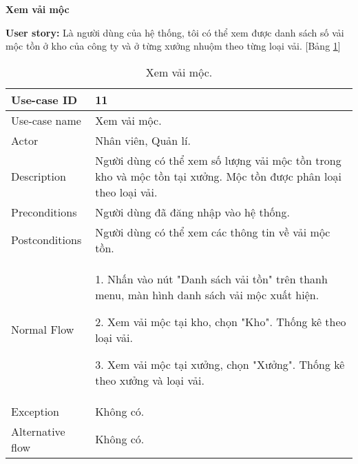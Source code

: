 \textbf{Xem vải mộc}\par
\textbf{User story:} Là người dùng của hệ thống, tôi có thể xem được danh sách số vải mộc tồn ở kho của công ty và ở từng xưởng nhuộm theo từng loại vải. [Bảng \ref{bang8}]
\begin{table}[H]
    \centering
    \begin{tabular}{|m{3cm}|m{10cm}|}
    \hline 
        Use-case ID & 11\\ \hline
        Use-case name & Xem vải mộc.\\ \hline
        Actor & Nhân viên, Quản lí.\\ \hline
        Description & Người dùng có thể xem số lượng vải mộc tồn trong kho và mộc tồn tại xưởng. Mộc tồn được phân loại theo loại vải.\\ \hline
        Preconditions & Người dùng đã đăng nhập vào hệ thống.\\ \hline
        Postconditions & Người dùng có thể xem các thông tin về vải mộc tồn.\\ \hline
        Normal Flow & 
        1. Nhấn vào nút "Danh sách vải tồn" trên thanh menu, màn hình danh sách vải mộc xuất hiện.\par
        2. Xem vải mộc tại kho, chọn "Kho". Thống kê theo loại vải.\par
        3. Xem vải mộc tại xưởng, chọn "Xưởng". Thống kê theo xưởng và loại vải.
        \\ \hline
        Exception & Không có.\\ \hline
        Alternative flow & Không có.\\ 
    \hline 
    \end{tabular}
    \caption{Xem vải mộc.}
    \label{bang8}
\end{table}


